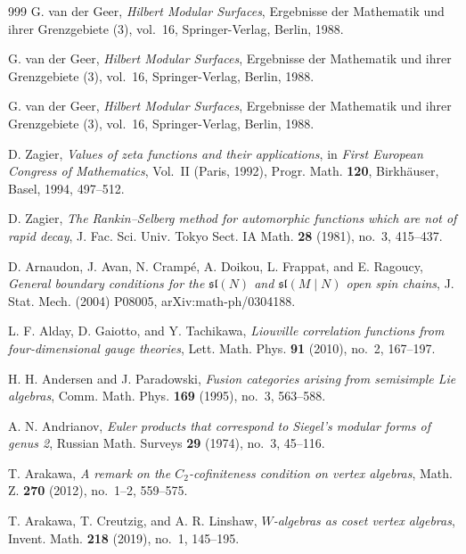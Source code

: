 \begin{thebibliography}{999}
G. van der Geer, \emph{Hilbert Modular Surfaces}, Ergebnisse der Mathematik und ihrer Grenzgebiete (3), vol.~16, Springer-Verlag, Berlin, 1988.

G. van der Geer, \emph{Hilbert Modular Surfaces}, Ergebnisse der Mathematik und ihrer Grenzgebiete (3), vol.~16, Springer-Verlag, Berlin, 1988.

G. van der Geer, \emph{Hilbert Modular Surfaces}, Ergebnisse der Mathematik und ihrer Grenzgebiete (3), vol.~16, Springer-Verlag, Berlin, 1988.

D. Zagier, \emph{Values of zeta functions and their applications}, in \emph{First European Congress of Mathematics}, Vol.~II (Paris, 1992), Progr. Math. \textbf{120}, Birkh\"auser, Basel, 1994, 497--512.

D. Zagier, \emph{The Rankin--Selberg method for automorphic functions
which are not of rapid decay}, J. Fac. Sci. Univ. Tokyo Sect. IA Math.
\textbf{28} (1981), no.~3, 415--437.


D. Arnaudon, J. Avan, N. Cramp\'e, A. Doikou, L. Frappat, and E. Ragoucy, \emph{General boundary conditions for the $\mathfrak{sl}(N)$ and $\mathfrak{sl}(M \mid N)$ open spin chains}, J. Stat. Mech. (2004) P08005, arXiv:math-ph/0304188.

L. F. Alday, D. Gaiotto, and Y. Tachikawa, \emph{Liouville correlation functions from four-dimensional gauge theories}, Lett. Math. Phys. \textbf{91} (2010), no.~2, 167--197.

H. H. Andersen and J. Paradowski, \emph{Fusion categories arising from semisimple Lie algebras}, Comm. Math. Phys. \textbf{169} (1995), no.~3, 563--588.

A. N. Andrianov, \emph{Euler products that correspond to Siegel's modular forms of genus 2}, Russian Math. Surveys \textbf{29} (1974), no.~3, 45--116.

T. Arakawa, \emph{A remark on the $C_2$-cofiniteness condition on vertex algebras}, Math. Z. \textbf{270} (2012), no.~1--2, 559--575.

T. Arakawa, T. Creutzig, and A. R. Linshaw, \emph{$W$-algebras as coset vertex algebras}, Invent. Math. \textbf{218} (2019), no.~1, 145--195.


\end{thebibliography}
